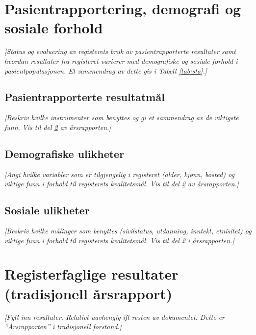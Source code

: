\documentclass[norsk, a4paper, twocolumn]{report}
\newcommand{\guide}[1] {
	\textit{[\textcolor{guidegray}{#1}]}
	}
\begin{document}
\chapter{Pasientrapportering, demografi og sosiale forhold}\label{cha:pas}
\guide{Status og evaluering av registerets bruk av pasientrapporterte
resultater samt
hvordan resultater fra registeret varierer med demografiske og sosiale forhold
i pasientpopulasjonen. Et sammendrag av dette gis i Tabell \ref{tab:sta}.}

\section{Pasientrapporterte resultatmål}\label{sec:pasutk}
\guide{Beskriv hvilke instrumenter som benyttes og gi et sammendrag av de
viktigste funn. Vis til del \ref{part:res} av årsrapporten.}

\section{Demografiske ulikheter}\label{sec:demuli}
\guide{Angi hvilke variabler som er tilgjengelig i registeret (alder, kjønn,
bosted) og viktige funn i forhold til registerets kvalitetsmål. Vis til del
\ref{part:res} av årsrapporten.}

\section{Sosiale ulikheter}\label{sec:sosuli}
\guide{Beskriv hvilke målinger som benyttes (sivilstatus, utdanning, inntekt,
etnisitet) og viktige funn i forhold til registerets kvalitetsmål. Vis til del
\ref{part:res} i årsrapporten.}


\chapter{Registerfaglige resultater (tradisjonell årsrapport)}\label{part:res}


\guide{Fyll inn resultater. Relativt uavhengig ift resten av dokumentet. Dette
er ``Årsrapporten'' i tradisjonell forstand.}

\end{document}
